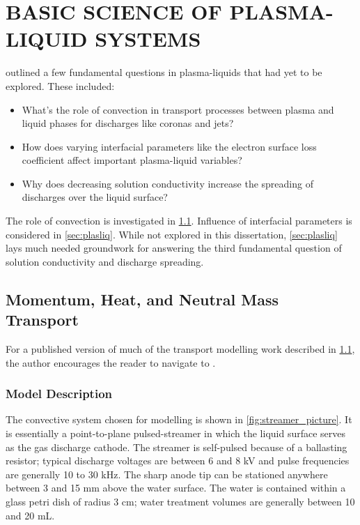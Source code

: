 \chapter{BASIC SCIENCE OF PLASMA-LIQUID SYSTEMS}
\label{chap:basic_science}

 outlined a few fundamental questions in plasma-liquids that had yet to be explored. These included:

\begin{itemize}
\item What's the role of convection in transport processes between plasma and liquid phases for discharges like coronas and jets?
\item How does varying interfacial parameters like the electron surface loss coefficient affect important plasma-liquid variables?
\item Why does decreasing solution conductivity increase the spreading of discharges over the liquid surface?
\end{itemize}

The role of convection is investigated in \cref{sec:plasfree_model}. Influence of interfacial parameters is considered in \cref{sec:plasliq}. While not explored in this dissertation, \cref{sec:plasliq} lays much needed groundwork for answering the third fundamental question of solution conductivity and discharge spreading.

\section{Momentum, Heat, and Neutral Mass Transport}
\label{sec:plasfree_model}

For a published version of much of the transport modelling work described in \cref{sec:plasfree_model}, the author encourages the reader to navigate to \cite{lindsay2015momentum}.

\subsection{Model Description}

The convective system chosen for modelling is shown in \cref{fig:streamer_picture}. It is essentially a point-to-plane pulsed-streamer in which the liquid surface serves as the gas discharge cathode. The streamer is self-pulsed because of a ballasting resistor; typical discharge voltages are between 6 and 8 kV and pulse frequencies are generally 10 to 30 kHz. The sharp anode tip can be stationed anywhere between 3 and 15 mm above the water surface. The water is contained within a glass petri dish of radius 3 cm; water treatment volumes are generally between 10 and 20 mL.


